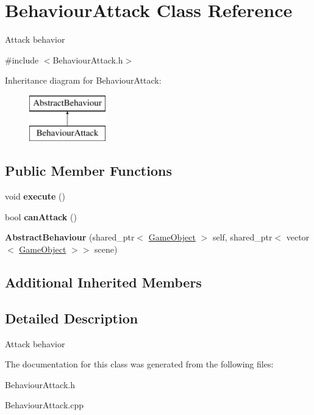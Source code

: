 \hypertarget{class_behaviour_attack}{}\section{Behaviour\+Attack Class Reference}
\label{class_behaviour_attack}


Attack behavior  




{\ttfamily \#include $<$Behaviour\+Attack.\+h$>$}

Inheritance diagram for Behaviour\+Attack\+:\begin{figure}[H]
\begin{center}
\leavevmode
\includegraphics[height=2.000000cm]{class_behaviour_attack}
\end{center}
\end{figure}
\subsection*{Public Member Functions}
\begin{DoxyCompactItemize}
\item 
\mbox{\label{class_behaviour_attack_aca669f46a6d32e5e41e7b477be1ee4cf}} 
void {\bfseries execute} ()
\item 
\mbox{\label{class_behaviour_attack_a539f70f642f0b21a808631fc64fbf2d8}} 
bool {\bfseries can\+Attack} ()
\item 
\mbox{\label{class_behaviour_attack_a8a3a9217b3179f949a1d6a32f340c00c}} 
{\bfseries Abstract\+Behaviour} (shared\+\_\+ptr$<$ \mbox{\hyperlink{class_game_object}{Game\+Object}} $>$ self, shared\+\_\+ptr$<$ vector$<$ \mbox{\hyperlink{class_game_object}{Game\+Object}} $>$$>$ scene)
\end{DoxyCompactItemize}
\subsection*{Additional Inherited Members}


\subsection{Detailed Description}
Attack behavior 



The documentation for this class was generated from the following files\+:\begin{DoxyCompactItemize}
\item 
Behaviour\+Attack.\+h\item 
Behaviour\+Attack.\+cpp\end{DoxyCompactItemize}
